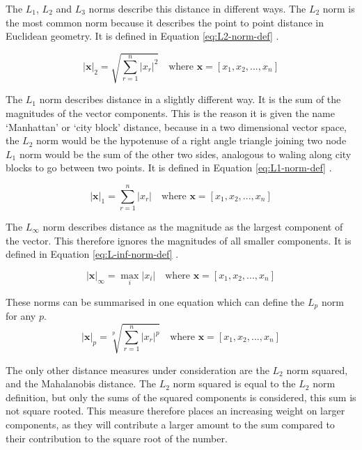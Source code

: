 \begin{appendices}
The $L_1$, $L_2$ and $L_3$ norms describe this distance in different ways. The $L_2$ norm is the most common norm because it describes the point to point distance in Euclidean geometry. It is defined in Equation \ref{eq:L2-norm-def} \cite[p. 1081]{gradshteyn2007}.

\begin{equation}
|\mathbf{x}|_2 = \sqrt{\sum_{r=1}^{n} |x_r|^2} \quad \text{where } \mathbf{x} = [ x_1 , x_2, ... , x_n] \label{eq:L2-norm-def}
\end{equation}

The $L_1$ norm describes distance in a slightly different way. It is the sum of the magnitudes of the vector components. This is the reason it is given the name `Manhattan' or `city block' distance, because in a two dimensional vector space, the $L_2$ norm would be the hypotenuse of a right angle triangle joining two node $L_1$ norm would be the sum of the other two sides, analogous to waling along city blocks to go between two points. It is defined in Equation \ref{eq:L1-norm-def} \cite[p. 1081]{gradshteyn2007}.

\begin{equation}
|\mathbf{x}|_1 = \sum_{r=1}^{n} |x_r| \quad \text{where } \mathbf{x} = [ x_1 , x_2, ... , x_n] \label{eq:L1-norm-def}
\end{equation}

The $L_\infty $ norm describes distance as the magnitude as the largest component of the vector. This therefore ignores the magnitudes of all smaller components. It is defined in Equation \ref{eq:L-inf-norm-def} \cite[p. 1081]{gradshteyn2007}.

\begin{equation}
|\mathbf{x}|_\infty = \max_{i} |x_i| \quad \text{where } \mathbf{x} = [ x_1 , x_2, ... , x_n] \label{eq:L-inf-norm-def}
\end{equation}

These norms can be summarised in one equation which can define the $L_p$ norm for any $p$.
\begin{equation}
|\mathbf{x}|_p = \sqrt[p]{\sum_{r=1}^{n} |x_r|^p} \quad \text{where } \mathbf{x} = [ x_1 , x_2, ... , x_n] \label{eq:Lp-norm-def}
\end{equation}

The only other distance measures under consideration are the $L_2$ norm squared, and the Mahalanobis distance. The $L_2$ norm squared is equal to the $L_2$ norm definition, but only the sums of the squared components is considered, this sum is not square rooted. This measure therefore places an increasing weight on larger components, as they will contribute a larger amount to the sum compared to their contribution to the square root of the number.


\end{appendices}

